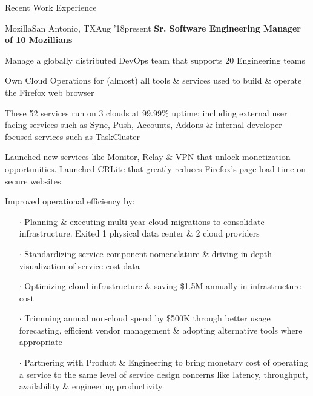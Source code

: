 \documentclass{resume} %
\begin{document}
\begin{rSection}{Recent Work Experience}


\begin{rSubsection}{Mozilla}{San Antonio, TX}{Aug '18}{present}
  {\textbf{Sr. Software Engineering Manager of 10 Mozillians}}

\item Manage a globally distributed DevOps team that supports 20 Engineering teams
\item Own Cloud Operations for (almost) all tools \& services used to build \& operate the Firefox web browser
\item These 52 services run on 3 clouds at 99.99\% uptime; including external user facing services such as \href{https://github.com/mozilla-services/syncstorage-rs}{Sync}, \href{https://github.com/mozilla-services/autopush-rs}{Push}, \href{https://github.com/mozilla/fxa}{Accounts}, \href{https://github.com/mozilla/addons}{Addons} \& internal developer focused services such as \href{https://github.com/taskcluster}{TaskCluster}
\item Launched new services like \href{https://monitor.firefox.com/}{Monitor}, \href{https://relay.firefox.com/}{Relay} \& \href{https://vpn.mozilla.org/}{VPN} that unlock monetization opportunities. Launched \href{https://blog.mozilla.org/security/2020/01/21/crlite-part-3-speeding-up-secure-browsing/}{CRLite} that greatly reduces Firefox's page load time on secure websites
  \item Improved operational efficiency by:
  \vspace{-0.5em}
    \begin{itemize} \itemsep0.5pt \parskip0pt
    \item[$\cdot$] Planning \& executing multi-year cloud migrations to consolidate infrastructure. Exited 1 physical data center \& 2 cloud providers
    \item[$\cdot$] Standardizing service component nomenclature \& driving in-depth visualization of service cost data
    \item[$\cdot$] Optimizing cloud infrastructure \& saving \$1.5M annually in infrastructure cost
    \item[$\cdot$] Trimming annual non-cloud spend by \$500K through better usage forecasting, efficient vendor management \& adopting alternative tools where appropriate
    \item[$\cdot$] Partnering with Product \& Engineering to bring monetary cost of operating a service to the same level of service design concerns like latency, throughput, availability \& engineering productivity

\end{itemize}
\end{rSubsection}
\end{rSection}
\end{document}
